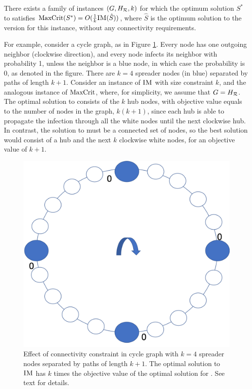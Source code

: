 \begin{observation}
\label{obs:infmax}
There exists a family of instances $(G, H_{\mathcal{R}}, k)$ for which the optimum solution
$S^*$ to \maxcrit{} satisfies
$\text{MaxCrit}(S^*) =O(\frac{1}{k}\textsc{IM}(\hat{S}))$, where $\hat{S}$ is the optimum
solution to the \infmax{} version for this instance, without any connectivity requirements.
\end{observation}

For example, consider a cycle graph, as in Figure \ref{fig:observation}. Every node has one outgoing neighbor (clockwise direction), and every node infects its neighbor with probability 1, unless the neighbor is a blue node, in which case the probability is 0, as denoted in the figure. There are $k=4$ spreader nodes (in blue) separated by paths of length $k+1$. Consider an instance of $\textsc{IM}{}$ with size constraint $k$, and the analogous instance of $\text{MaxCrit}{}$, where, for simplicity, we assume that $G = H_{\mathcal{R}}$. The optimal solution to \infmax{} consists of the $k$ hub nodes, with objective value equals to the number of nodes in the graph, $k(k+1)$, since each hub is able to propagate the infection through all the white nodes until the next clockwise hub. In contrast, the solution to \maxcrit{} must be a connected set of nodes, so the best solution would consist of a hub and the next $k$ clockwise white nodes, for an objective value of $k + 1$.

\begin{figure}
    \centering
    \includegraphics[width=.4\columnwidth]{img/observation.png}
    \caption{Effect of connectivity constraint in cycle graph with $k=4$ spreader nodes separated by paths of length $k + 1$. The optimal solution to $\textsc{IM}{}$ has $k$ times the objective value of the optimal solution for \maxcrit{}. See text for details.}
    \label{fig:observation}
\end{figure}

